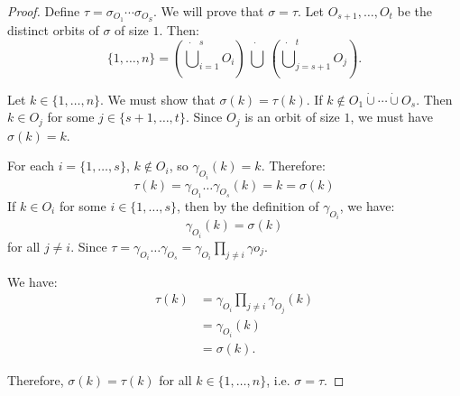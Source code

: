 \begin{itemize}
\begin{proof}
        Define $\tau=\sigma_{O_1}\cdots \sigma_{O_S}$. We will prove that $\sigma = \tau$. Let $O_{s+1},\dots, O_t$ be the distinct orbits of $\sigma$ of size $1$. Then:
        \begin{equation}
            \{1, \dots, n\} = \left(\dot{\bigcup}_{i=1}^{s}O_i\right)\,\dot\bigcup\,\left(\dot{\bigcup}_{j=s+1}^{t}O_j\right).
        \end{equation}

        Let $k\in \{1,\dots, n\}$. We must show that $\sigma(k)=\tau(k)$. If $k\notin O_1 \dot\cup \cdots \dot\cup O_s$. Then $k\in O_j$ for some $j\in \{s+1,\dots,t\}$. Since $O_j$ is an orbit of size $1$, we must have $\sigma(k)=k$.

        For each $i=\{1,\dots,s\}$, $k\notin O_i$, so $\gamma_{O_i}(k)=k$. Therefore:
        \begin{equation}
            \tau(k)=\gamma_{O_1}\dots\gamma_{O_s}(k) = k = \sigma(k)
        \end{equation}
        If $k\in O_i$ for some $i \in \{1,\dots,s\}$, then by the definition of $\gamma_{O_i}$, we have:
        \begin{equation}
            \gamma_{O_i}(k)=\sigma(k)
        \end{equation}
        for all $j \neq i$. Since
        $\tau = \gamma_{O_i}\dots \gamma_{O_s} = \gamma_{O_i}\prod_{j\neq i} \gamma o_j$.

        We have:
        \begin{align}
            \tau(k) &= \gamma_{O_i}\prod_{j\neq i}\gamma_{O_j}(k) \\
            &= \gamma_{O_i}(k) \\ 
            &= \sigma(k). 
        \end{align}

        Therefore, $\sigma(k)=\tau(k)$ for all $k\in \{1,\dots,n\}$, i.e. $\sigma=\tau$.


\end{proof}
\end{itemize}
